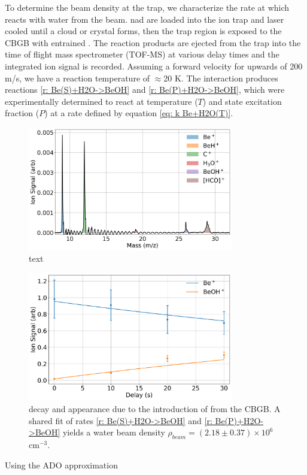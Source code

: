 To determine the beam density at the trap, we characterize the rate at which  reacts with water from the beam.  nad  are loaded into the ion trap and laser cooled until a cloud or crystal forms, then the trap region is exposed to the CBGB with entrained . The reaction products are ejected from the trap into the time of flight mass spectrometer (TOF-MS) at various delay times and the integrated ion signal is recorded. Assuming a forward velocity for  upwards of 200 m/s, we have a reaction temperature of $\approx$20 K. The interaction produces reactions \ref{r: Be(S)+H2O->BeOH} and \ref{r: Be(P)+H2O->BeOH}, which were experimentally determined to react at temperature ($T$) and  state excitation fraction ($P$) at a rate defined by equation \ref{eq: k Be+H2O(T)}.

\begin{figure}[H]
	\centering
	\includegraphics[width=0.8\textwidth]{images/C_H2O_beam_TOF.png}
	\caption{text}
	\label{fig: Be C H2O beam TOF}
\end{figure}

\begin{figure}[H]
	\centering
	\includegraphics[width=0.8\textwidth]{images/Be_H2O_beam_traces.png}
	\caption{ decay and  appearance due to the introduction of  from the CBGB. A shared fit of rates \ref{r: Be(S)+H2O->BeOH} and \ref{r: Be(P)+H2O->BeOH} yields a water beam density $\rho_{beam} = (2.18 \pm 0.37) \times 10^6$ cm$^{-3}$.}
	\label{fig: Be H2O beam}
\end{figure}

Using the ADO approximation